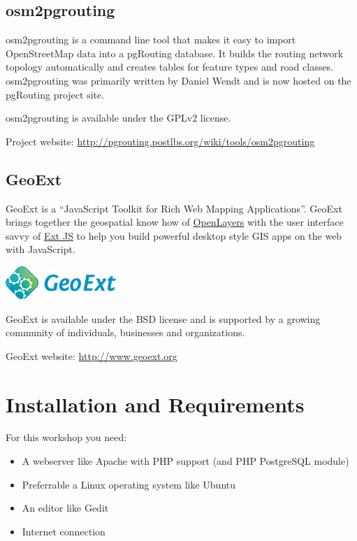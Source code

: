 \documentclass[a4paper,10pt,english]{manual}
\begin{document}
\section{osm2pgrouting}

osm2pgrouting is a command line tool that makes it easy to import OpenStreetMap data into a pgRouting database. It builds the routing network topology automatically and creates tables for feature types and road classes. osm2pgrouting was primarily written by Daniel Wendt and is now hosted on the pgRouting project site.

osm2pgrouting is available under the GPLv2 license.

Project website: \href{http://pgrouting.postlbs.org/wiki/tools/osm2pgrouting}{http://pgrouting.postlbs.org/wiki/tools/osm2pgrouting}


\section{GeoExt}

GeoExt is a ``JavaScript Toolkit for Rich Web Mapping Applications''. GeoExt brings together the geospatial know how of \href{http://www.openlayers.org}{OpenLayers} with the user interface savvy of \href{http://www.sencha.com}{Ext JS} to help you build powerful desktop style GIS apps on the web with JavaScript.

{\hfill\includegraphics{GeoExt.png}\hfill}

GeoExt is available under the BSD license and is supported by a growing community of individuals, businesses and organizations.

GeoExt website: \href{http://www.geoext.org}{http://www.geoext.org}

\resetcurrentobjects
\hypertarget{--doc-chapters/installation}{}

\chapter{Installation and Requirements}

For this workshop you need:
\begin{itemize}
\item {} 
A webserver like Apache with PHP support (and PHP PostgreSQL module)

\item {} 
Preferrable a Linux operating system like Ubuntu

\item {} 
An editor like Gedit

\item {} 
Internet connection

\end{itemize}
\end{document}

